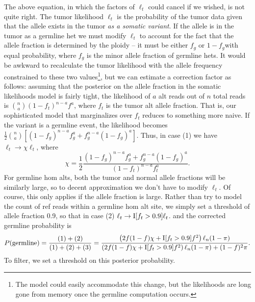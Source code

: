 \documentclass[nofootinbib,amssymb,amsmath]{revtex4}
\begin{document}
The above equation, in which the factors of $\ell_t$ could cancel if we wished, is not quite right.  The tumor likelihood $\ell_t$ is the probability of the tumor data given that the allele exists in the tumor \textit{as a somatic variant}.  If the allele is in the tumor as a germline het we must modify $\ell_t$ to account for the fact that the allele fraction is determined by the ploidy -- it must be either $f_g$ or $1- f_g$with equal probability, where $f_g$ is the minor allele fraction of germline hets.  It would be awkward to recalculate the tumor likelihood with the allele frequency constrained to these two values\footnote{The model could easily accommodate this change, but the likelihoods are long gone from memory once the germline computation occurs.}, but we can estimate a correction factor as follows:  assuming that the posterior on the allele fraction in the somatic likelihoods model is fairly tight, the likelihood of $a$ alt reads out of $n$ total reads is $\binom na (1-f_t)^{n-a}f^a$, where $f_t$ is the tumor alt allele fraction.  That is, our sophisticated model that marginalizes over $f_t$ reduces to something more naive.  If the variant is a germline event, the likelihood becomes $\frac{1}{2} \binom na  \left[(1-f_g)^{n-a}f_g^a + f_g^{n-a}(1-f_g)^a \right]$.  Thus, in case (1) we have $\ell_t \rightarrow \chi \ell_t$, where
\begin{equation}
\chi = \frac{1}{2} \frac{(1-f_g)^{n-a}f_g^a + f_g^{n-a}(1-f_g)^a}{(1-f_t)^{n-a}f_t^a}.
\end{equation}
For germline hom alts, both the tumor and normal allele fractions will be similarly large, so to decent approximation we don't have to modify $\ell_t$.  Of course, this only applies if the allele fraction is large.  Rather than try to model the count of ref reads within a germline hom alt site, we simply set a threshold of allele fraction 0.9, so that in case (2) $\ell_t \rightarrow {\rm I}[f_t > 0.9] \ell_t$.
and the corrected germline probability is
\begin{equation}
P({\rm germline}) = \frac{(1) + (2)}{(1) + (2) + (3)} = \frac{\left( 2f(1-f) \chi + {\rm I}[f_t > 0.9] f^2 \right) \ell_n (1 - \pi)}{\left( 2f(1-f) \chi + {\rm I}[f_t > 0.9] f^2 \right) \ell_n  (1 - \pi) + (1-f)^2  \pi}.
\end{equation}
To filter, we set a threshold on this posterior probability.
\end{document}
